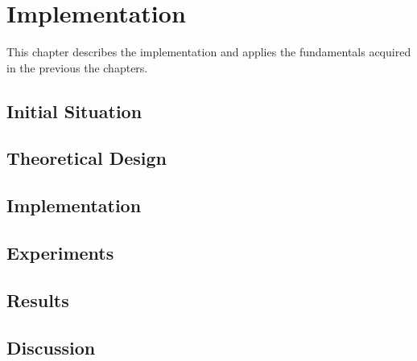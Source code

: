 \chapter{Implementation}
\label{ch:Implementation}

This chapter describes the implementation and applies the fundamentals acquired in the previous the chapters.

\section{Initial Situation}

\section{Theoretical Design}

\section{Implementation}

\section{Experiments}

\section{Results}

\section{Discussion}

